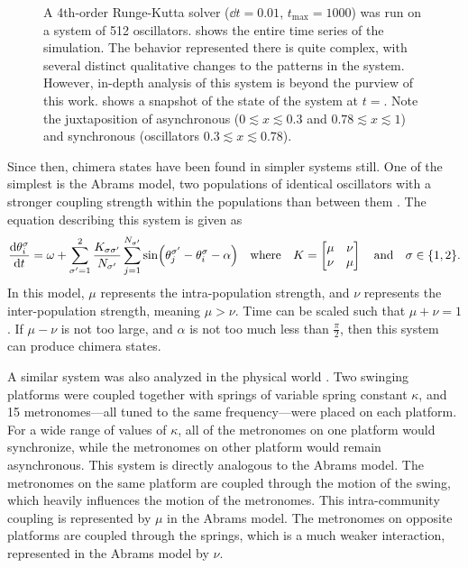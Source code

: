 \begin{figure}[ht]
{    A 4th-order Runge-Kutta solver ($\dd{t} = 0.01$, $t_{\text{max}} = 1000$) was run on a system of 512 oscillators.
     shows the entire time series of the simulation.
    The behavior represented there is quite complex, with several distinct qualitative changes to the patterns in the system.
    However, in-depth analysis of this system is beyond the purview of this work.
     shows a snapshot of the state of the system at $t = $.
    Note the juxtaposition of asynchronous ($0 \lesssim x \lesssim 0.3$ and $0.78 \lesssim x \lesssim 1$) and synchronous (oscillators $0.3 \lesssim x \lesssim 0.78$).
  }
  \label{fig:kuramoto_chimera}
\end{figure}

Since then, chimera states have been found in simpler systems still.
One of the simplest is the Abrams model, two populations of identical oscillators with a stronger coupling strength within the populations than between them \cite{Abrams2008}.
The equation describing this system is given as
\begin{equation}
  \label{eq:abrams}
  \dv{\theta_{i}^{\sigma}}{t}
  =
  \omega
  +
  \sum_{\sigma' = 1}^{2} \frac{K_{\sigma \sigma'}}{N_{\sigma'}} \sum_{j = 1}^{N_{\sigma'}} \sin(\theta_{j}^{\sigma'} - \theta_{i}^{\sigma} - \alpha)
  \qq{where}
  K
  =
  \bmqty{\mu & \nu \\ \nu & \mu}
  \qand
  \sigma \in \Bqty{1, 2}.
\end{equation}
In this model, $\mu$ represents the intra-population strength, and $\nu$ represents the inter-population strength, meaning $\mu > \nu$.
Time can be scaled such that $\mu + \nu = 1$.
If $\mu - \nu$ is not too large, and $\alpha$ is not too much less than $\frac{\pi}{2}$, then this system can produce chimera states.

A similar system was also analyzed in the physical world \cite{Martens2013}.
Two swinging platforms were coupled together with springs of variable spring constant $\kappa$, and 15 metronomes---all tuned to the same frequency---were placed on each platform.
For a wide range of values of $\kappa$, all of the metronomes on one platform would synchronize, while the metronomes on other platform would remain asynchronous.
This system is directly analogous to the Abrams model.
The metronomes on the same platform are coupled through the motion of the swing, which heavily influences the motion of the metronomes.
This intra-community coupling is represented by $\mu$ in the Abrams model.
The metronomes on opposite platforms are coupled through the springs, which is a much weaker interaction, represented in the Abrams model by $\nu$.

